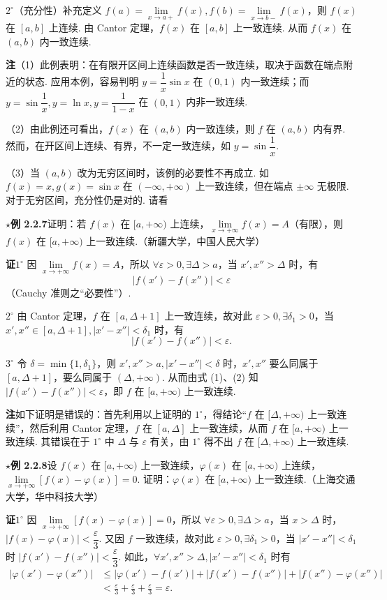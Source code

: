 \documentclass[UTF8, 12pt, fontset=fandol, oneside]{ctexart}
\begin{document}
$2^\circ$（充分性）补充定义 $f(a)=\lim\limits_{x\to a+}f(x),f(b)=\lim\limits_{x\to b-}f(x)$，则 $f(x)$ 在 $[a,b]$ 上连续. 由 Cantor 定理，$f(x)$ 在 $[a,b]$ 上一致连续. 从而 $f(x)$ 在 $(a,b)$ 内一致连续.

\noindent\textbf{注}\quad （1）此例表明：在有限开区间上连续函数是否一致连续，取决于函数在端点附近的状态. 应用本例，容易判明 $y=\dfrac1x\sin x$ 在 $(0,1)$ 内一致连续；而 $y=\sin\dfrac1x,y=\ln x,y=\dfrac1{1-x}$ 在 $(0,1)$ 内非一致连续.

（2）由此例还可看出，$f(x)$ 在 $(a,b)$ 内一致连续，则 $f$ 在 $(a,b)$ 内有界. 然而，在开区间上连续、有界，不一定一致连续，如 $y=\sin\dfrac1x$.

（3）当 $(a,b)$ 改为无穷区间时，该例的必要性不再成立. 如 $f(x)=x,g(x)=\sin x$ 在 $(-\infty,+\infty)$ 上一致连续，但在端点 $\pm\infty$ 无极限. 对于无穷区间，充分性仍是对的. 请看

\noindent\textbf{$\star$例 2.2.7}\quad 证明：若 $f(x)$ 在 $[a,+\infty)$ 上连续，$\lim\limits_{x\to+\infty}f(x)=A$（有限），则 $f(x)$ 在 $[a,+\infty)$ 上一致连续.（新疆大学，中国人民大学）

\noindent\textbf{证}\quad $1^\circ$ 因 $\lim\limits_{x\to+\infty}f(x)=A$，所以 $\forall\varepsilon>0,\exists\Delta>a$，当 $x',x''>\Delta$ 时，有
\[
  |f(x')-f(x'')|<\varepsilon \tag{1}
\]
（Cauchy 准则之“必要性”）.

$2^\circ$ 由 Cantor 定理，$f$ 在 $[a,\Delta+1]$ 上一致连续，故对此 $\varepsilon>0,\exists\delta_1>0$，当 $x',x''\in[a,\Delta+1],|x'-x''|<\delta_1$ 时，有
\[
  |f(x')-f(x'')|<\varepsilon. \tag{2}
\]

$3^\circ$ 令 $\delta=\min\{1,\delta_1\}$，则 $x',x''>a,|x'-x''|<\delta$ 时，$x',x''$ 要么同属于 $[a,\Delta+1]$，要么同属于 $(\Delta,+\infty)$. 从而由式 (1)、(2) 知 $|f(x')-f(x'')|<\varepsilon$，即 $f$ 在 $[a,+\infty)$ 上一致连续.

\noindent\textbf{注}\quad 如下证明是错误的：首先利用以上证明的 $1^\circ$，得结论“$f$ 在 $[\Delta,+\infty)$ 上一致连续”，然后利用 Cantor 定理，$f$ 在 $[a,\Delta]$ 上一致连续，从而 $f$ 在 $[a,+\infty)$ 上一致连续. 其错误在于 $1^\circ$ 中 $\Delta$ 与 $\varepsilon$ 有关，由 $1^\circ$ 得不出 $f$ 在 $[\Delta,+\infty)$ 上一致连续.

\noindent\textbf{$\star$例 2.2.8}\quad 设 $f(x)$ 在 $[a,+\infty)$ 上一致连续，$\varphi(x)$ 在 $[a,+\infty)$ 上连续，$\lim\limits_{x\to+\infty}[f(x)-\varphi(x)]=0$. 证明：$\varphi(x)$ 在 $[a,+\infty)$ 上一致连续.（上海交通大学，华中科技大学）

\noindent\textbf{证}\quad $1^\circ$ 因 $\lim\limits_{x\to+\infty}[f(x)-\varphi(x)]=0$，所以 $\forall\varepsilon>0,\exists\Delta>a$，当 $x>\Delta$ 时，$|f(x)-\varphi(x)|<\dfrac\varepsilon3$. 又因 $f$ 一致连续，故对此 $\varepsilon>0,\exists\delta_1>0$，当 $|x'-x''|<\delta_1$ 时 $|f(x')-f(x'')|<\dfrac\varepsilon3$. 如此，$\forall x',x''>\Delta,|x'-x''|<\delta_1$ 时有
\[
\begin{aligned}
|\varphi(x')-\varphi(x'')|
&\le |\varphi(x')-f(x')|+|f(x')-f(x'')|+|f(x'')-\varphi(x'')|\\
&<\frac\varepsilon3+\frac\varepsilon3+\frac\varepsilon3=\varepsilon.
\end{aligned}
\]
\end{document}
